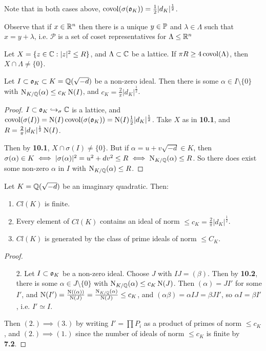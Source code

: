 \documentclass[10pt,a4paper]{article}
\begin{document}
Note that in both cases above, $\covol(\sigma(\o_K)) = \frac12|d_K|^{\frac12}$.

Observe that if $x \in \R^n$ then there is a unique $y \in \P$ and $\lambda \in \Lambda$ such that $x = y +\lambda$, i.e. $\mathcal{P}$ is a set of coset representatives for $\Lambda \leq \R^n$

\begin{theorem}
Let $X = \{z \in \C : |z|^2 \leq R\}$, and $\Lambda \subset \C$ be a lattice. If $\pi R \geq 4 \covol(\Lambda)$, then $X \cap \Lambda \neq \{0\}$.
\end{theorem}
\begin{theorem}
Let $I \subset \o_K \subset K = \Q(\sqrt{-d})$ be a non-zero ideal. Then there is some $\alpha \in I\setminus\{0\}$ with $\Nn_{K/\Q}(\alpha)\leq c_K \Nn(I)$, and $c_K = \frac{2}{\pi}|d_K|^{\frac12}$.
\end{theorem}
\begin{proof}
$I \subset \o_K \injection_\sigma \C$ is a lattice, and $\covol(\sigma(I)) = \Nn(I)\covol(\sigma(\o_K)) = \Nn(I)\frac{1}{2}|d_K|^{\frac12}$. Take $X$ as in \textbf{10.1}, and $R = \frac{2}{\pi}|d_K|^{\frac12}\Nn(I)$.

Then by \textbf{10.1}, $X \cap \sigma(I) \neq \{0\}$. But if $\alpha = u +v\sqrt{-d} \in K$, then $\sigma(\alpha) \in K \iff |\sigma(\alpha)|^2 = u^2+dv^2 \leq R \iff \Nn_{K/\Q}(\alpha) \leq R$. So there does exist some non-zero $\alpha$ in $I$ with $\Nn_{K/\Q}(\alpha) \leq R$.
\end{proof}

\begin{corollary}
Let $K = \Q(\sqrt{-d})$ be an imaginary quadratic. Then:
\begin{enumerate}
\item $Cl(K)$ is finite.
\item Every element of $Cl(K)$ contains an ideal of norm $\leq c_K = \frac{2}{\pi}|d_K|^{\frac12}$.
\item $Cl(K)$ is generated by the class of prime ideals of norm $\leq C_K$.
\end{enumerate}
\end{corollary}
\begin{proof}
\begin{itemize}
\item[2.] Let $I \subset \o_K$ be a non-zero ideal. Choose $J$ with $IJ = (\beta)$. Then by \textbf{10.2}, there is some $\alpha \in J \setminus \{0\}$ with $\Nn_{K/\Q}(\alpha) \leq c_K \Nn(J)$. Then $(\alpha) = JI'$ for some $I'$, and $\Nn(I') = \frac{\Nn((\alpha))}{\Nn(J)} = \frac{\Nn_{K/\Q}(\alpha)}{\Nn(J)} \leq c_K$, and $(\alpha\beta) = \alpha IJ = \beta JI'$, so $\alpha I = \beta I'$, i.e. $I' \simeq I$.
\end{itemize}
Then $(2.)\implies(3.)$ by writing $I' = \prod P_i$ as a product of primes of norm $\leq c_K$, and $(2.)\implies(1.)$ since the number of ideals of norm $\leq c_K$ is finite by \textbf{7.2}.
\end{proof}
\end{document}
